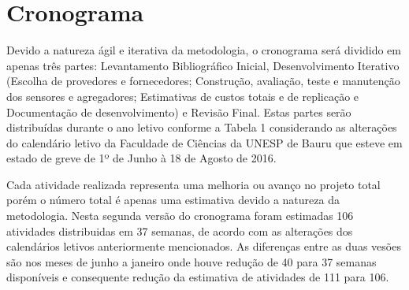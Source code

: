 
\section{Cronograma}
\label{sec:Cronograma}

Devido a natureza ágil e iterativa da metodologia, o cronograma será dividido em
apenas três partes: Levantamento Bibliográfico Inicial, Desenvolvimento
Iterativo (Escolha de provedores e fornecedores; Construção, avaliação, teste e
manutenção dos sensores e agregadores; Estimativas de custos totais e de
replicação e Documentação de desenvolvimento) e Revisão Final. Estas partes
serão distribuídas durante o ano letivo conforme a Tabela 1 considerando as
alterações do calendário letivo da Faculdade de Ciências da UNESP de Bauru que
esteve em estado de greve de 1º de Junho à 18 de Agosto de 2016.

\begin{table}[htb]
\end{table}

Cada atividade realizada representa uma melhoria ou avanço no projeto total
porém o número total é apenas uma estimativa devido a natureza da metodologia.
Nesta segunda versão do cronograma foram estimadas 106 atividades distribuidas
em 37 semanas, de acordo com as alterações dos calendários letivos anteriormente
mencionados. As diferenças entre as duas vesões são nos meses de junho a janeiro
onde houve redução de 40 para 37 semanas disponíveis e consequente redução da
estimativa de atividades de 111 para 106.
